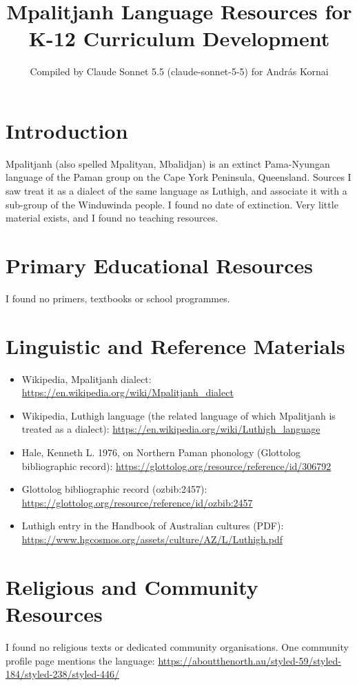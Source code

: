 \documentclass[12pt]{article}
\title{Mpalitjanh Language Resources for K-12 Curriculum Development}
\author{Compiled by Claude Sonnet 5.5 (claude-sonnet-5-5) for Andr\'as Kornai}
\date{}
\begin{document}
\maketitle

\section{Introduction}
Mpalitjanh (also spelled Mpalityan, Mbalidjan) is an extinct Pama-Nyungan language of the Paman group on the Cape York Peninsula, Queensland. Sources I saw treat it as a dialect of the same language as Luthigh, and associate it with a sub-group of the Winduwinda people. I found no date of extinction. Very little material exists, and I found no teaching resources.

\section{Primary Educational Resources}
I found no primers, textbooks or school programmes.

\section{Linguistic and Reference Materials}
\begin{itemize}
\item Wikipedia, Mpalitjanh dialect: \url{https://en.wikipedia.org/wiki/Mpalitjanh_dialect}
\item Wikipedia, Luthigh language (the related language of which Mpalitjanh is treated as a dialect): \url{https://en.wikipedia.org/wiki/Luthigh_language}
\item Hale, Kenneth L. 1976, on Northern Paman phonology (Glottolog bibliographic record): \url{https://glottolog.org/resource/reference/id/306792}
\item Glottolog bibliographic record (ozbib:2457): \url{https://glottolog.org/resource/reference/id/ozbib:2457}
\item Luthigh entry in the Handbook of Australian cultures (PDF): \url{https://www.hgcosmos.org/assets/culture/AZ/L/Luthigh.pdf}
\end{itemize}

\section{Religious and Community Resources}
I found no religious texts or dedicated community organisations. One community profile page mentions the language: \url{https://aboutthenorth.au/styled-59/styled-184/styled-238/styled-446/}
\end{document}

